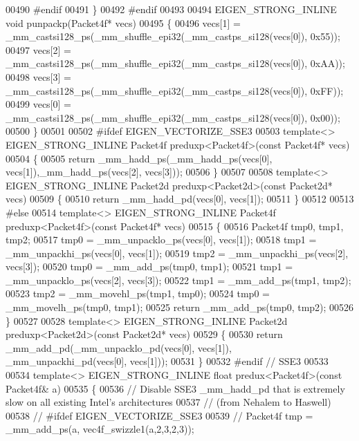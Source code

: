 \begin{DoxyCode}
00490 \textcolor{preprocessor}{#endif}
00491 \}
00492 \textcolor{preprocessor}{#endif}
00493 
00494 EIGEN\_STRONG\_INLINE \textcolor{keywordtype}{void} punpackp(Packet4f* vecs)
00495 \{
00496   vecs[1] = \_mm\_castsi128\_ps(\_mm\_shuffle\_epi32(\_mm\_castps\_si128(vecs[0]), 0x55));
00497   vecs[2] = \_mm\_castsi128\_ps(\_mm\_shuffle\_epi32(\_mm\_castps\_si128(vecs[0]), 0xAA));
00498   vecs[3] = \_mm\_castsi128\_ps(\_mm\_shuffle\_epi32(\_mm\_castps\_si128(vecs[0]), 0xFF));
00499   vecs[0] = \_mm\_castsi128\_ps(\_mm\_shuffle\_epi32(\_mm\_castps\_si128(vecs[0]), 0x00));
00500 \}
00501 
00502 \textcolor{preprocessor}{#ifdef EIGEN\_VECTORIZE\_SSE3}
00503 \textcolor{keyword}{template}<> EIGEN\_STRONG\_INLINE Packet4f preduxp<Packet4f>(\textcolor{keyword}{const} Packet4f* vecs)
00504 \{
00505   \textcolor{keywordflow}{return} \_mm\_hadd\_ps(\_mm\_hadd\_ps(vecs[0], vecs[1]),\_mm\_hadd\_ps(vecs[2], vecs[3]));
00506 \}
00507 
00508 \textcolor{keyword}{template}<> EIGEN\_STRONG\_INLINE Packet2d preduxp<Packet2d>(\textcolor{keyword}{const} Packet2d* vecs)
00509 \{
00510   \textcolor{keywordflow}{return} \_mm\_hadd\_pd(vecs[0], vecs[1]);
00511 \}
00512 
00513 \textcolor{preprocessor}{#else}
00514 \textcolor{keyword}{template}<> EIGEN\_STRONG\_INLINE Packet4f preduxp<Packet4f>(\textcolor{keyword}{const} Packet4f* vecs)
00515 \{
00516   Packet4f tmp0, tmp1, tmp2;
00517   tmp0 = \_mm\_unpacklo\_ps(vecs[0], vecs[1]);
00518   tmp1 = \_mm\_unpackhi\_ps(vecs[0], vecs[1]);
00519   tmp2 = \_mm\_unpackhi\_ps(vecs[2], vecs[3]);
00520   tmp0 = \_mm\_add\_ps(tmp0, tmp1);
00521   tmp1 = \_mm\_unpacklo\_ps(vecs[2], vecs[3]);
00522   tmp1 = \_mm\_add\_ps(tmp1, tmp2);
00523   tmp2 = \_mm\_movehl\_ps(tmp1, tmp0);
00524   tmp0 = \_mm\_movelh\_ps(tmp0, tmp1);
00525   \textcolor{keywordflow}{return} \_mm\_add\_ps(tmp0, tmp2);
00526 \}
00527 
00528 \textcolor{keyword}{template}<> EIGEN\_STRONG\_INLINE Packet2d preduxp<Packet2d>(\textcolor{keyword}{const} Packet2d* vecs)
00529 \{
00530   \textcolor{keywordflow}{return} \_mm\_add\_pd(\_mm\_unpacklo\_pd(vecs[0], vecs[1]), \_mm\_unpackhi\_pd(vecs[0], vecs[1]));
00531 \}
00532 \textcolor{preprocessor}{#endif  // SSE3}
00533 
00534 \textcolor{keyword}{template}<> EIGEN\_STRONG\_INLINE \textcolor{keywordtype}{float} predux<Packet4f>(\textcolor{keyword}{const} Packet4f& a)
00535 \{
00536   \textcolor{comment}{// Disable SSE3 \_mm\_hadd\_pd that is extremely slow on all existing Intel's architectures}
00537   \textcolor{comment}{// (from Nehalem to Haswell)}
00538 \textcolor{comment}{// #ifdef EIGEN\_VECTORIZE\_SSE3}
00539 \textcolor{comment}{//   Packet4f tmp = \_mm\_add\_ps(a, vec4f\_swizzle1(a,2,3,2,3));}

\end{DoxyCode}
